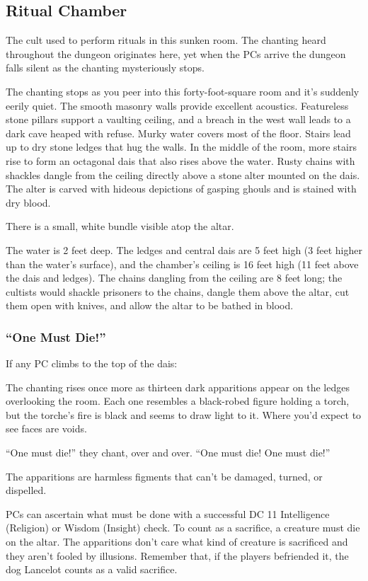 \subsection{Ritual Chamber}
\label{sec:RitualChamber}
The cult used to perform rituals in this sunken room. The chanting heard throughout the dungeon originates here,
yet when the PCs arrive the dungeon falls silent as the chanting mysteriously stops.
\begin{readout}
  The chanting stops as you peer into this forty-foot-square room and it's suddenly eerily quiet. The smooth
  masonry walls provide excellent acoustics. Featureless stone pillars support a vaulting ceiling, and a breach
  in the west wall leads to a dark cave heaped with refuse. Murky water covers most of the floor. Stairs
  lead up to dry stone ledges that hug the walls. In the middle of the room, more stairs rise to form an
  octagonal dais that also rises above the water. Rusty chains with shackles dangle from the ceiling directly
  above a stone alter mounted on the dais. The alter is carved with hideous depictions of gasping ghouls and
  is stained with dry blood.
  
  There is a small, white bundle visible atop the altar.
\end{readout}
The water is 2 feet deep. The ledges and central dais are 5 feet high (3 feet higher than the water's surface),
and the chamber's ceiling is 16 feet high (11 feet above the dais and ledges). The chains dangling from the
ceiling are 8 feet long; the cultists would shackle prisoners to the chains, dangle them above the altar, cut
them open with knives, and allow the altar to be bathed in blood.

\subsubsection*{``One Must Die!''}
If any PC climbs to the top of the dais:
\begin{readout}
  The chanting rises once more as thirteen dark apparitions appear on the ledges overlooking the room. Each one
  resembles a black-robed figure holding a torch, but the torche's fire is black and seems to draw light to it.
  Where you'd expect to see faces are voids.
  
  ``One must die!'' they chant, over and over. ``One must die! One must die!''
\end{readout}
The apparitions are harmless figments that can't be damaged, turned, or dispelled.

PCs can ascertain what must be done with a successful DC 11 Intelligence (Religion) or Wisdom (Insight) check.
To count as a sacrifice, a creature must die on the altar. The apparitions don't care what kind of creature
is sacrificed and they aren't fooled by illusions. Remember that, if the players befriended it, the dog Lancelot
counts as a valid sacrifice.

